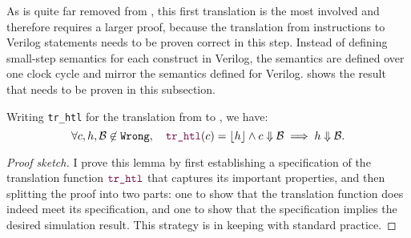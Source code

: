 As \htl{} is quite far removed from \rtlsubpar{}, this first translation is the
most involved and therefore requires a larger proof, because the translation
from \rtlsubpar{} instructions to Verilog statements needs to be proven correct
in this step. Instead of defining small-step semantics for each construct in
Verilog, the semantics are defined over one clock cycle and mirror the semantics
defined for Verilog.   shows the result that needs to be proven
in this subsection.

\begin{lemma}\label{lemma:htl}
  Writing \texttt{tr\_htl} for the translation from \rtlsubpar{} to \htl{}, we
  have:
  \begin{equation*}
    \forall c, h, \mathcal{B} \not\in \texttt{Wrong},\quad \yhfunction{tr\_htl} (c) = \ccok{h} \land c \Downarrow \mathcal{B} \implies h \Downarrow \mathcal{B}.
  \end{equation*}
\end{lemma}

\begin{proof}[Proof sketch]
  I prove this lemma by first establishing a specification of the translation
  function $\yhfunction{tr\_htl}$ that captures its important properties, and
  then splitting the proof into two parts: one to show that the translation
  function does indeed meet its specification, and one to show that the
  specification implies the desired simulation result. This strategy is in
  keeping with standard \compcert{} practice.

\end{proof}

